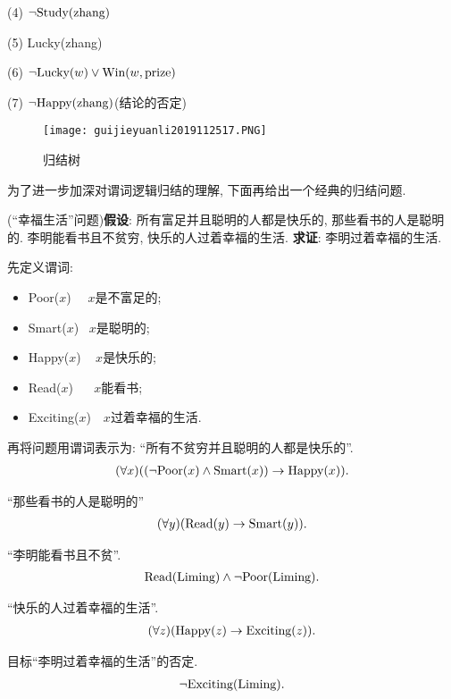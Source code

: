     (4) $\neg \textup{Study}(\textup{zhang})$

    (5) \textup{Lucky}(\textup{zhang})

    (6) $\neg \textup{Lucky}(w)\vee \textup{Win}(w, \textup{prize})$

    (7) $\neg \textup{Happy}(\textup{zhang})$(结论的否定)
\begin{figure}[H]
\centering
\texttt{[image: guijieyuanli2019112517.PNG]}
\caption{归结树}
\label{AI32fig17}
\end{figure}

为了进一步加深对谓词逻辑归结的理解, 下面再给出一个经典的归结问题.
\begin{example}
    (“幸福生活”问题)\textbf{假设}: 所有富足并且聪明的人都是快乐的, 那些看书的人是聪明的. 李明能看书且不贫穷, 快乐的人过着幸福的生活.
\textbf{求证}: 李明过着幸福的生活.
\end{example}
\begin{result}
先定义谓词:
\begin{itemize}
    \item Poor($x$)     \quad\,\,\,\,  $x$是不富足的;
    \item Smart($x$)    \quad\,  $x$是聪明的;
    \item Happy($x$)    \,\,\, $x$是快乐的;
    \item Read($x$)     \,\,\,\,\,\, $x$能看书;
    \item Exciting($x$) \,\, $x$过着幸福的生活.
\end{itemize}

再将问题用谓词表示为: “所有不贫穷并且聪明的人都是快乐的”.
\begin{align}
    (\forall x)((\neg \textup{Poor}(x)\wedge \textup{Smart}(x))\rightarrow \textup{Happy}(x)).
\end{align}

“那些看书的人是聪明的”
\begin{align}
    (\forall y) (\textup{Read}(y) \rightarrow  \textup{Smart}(y)).
\end{align}

“李明能看书且不贫”.
\begin{align}
    \textup{Read}(\textup{Liming})\wedge \neg \textup{Poor}(\textup{Liming}).
\end{align}

“快乐的人过着幸福的生活”.
\begin{align}
    (\forall z) (\textup{Happy}(z)\rightarrow \textup{Exciting}(z)).
\end{align}

目标“李明过着幸福的生活”的否定.
\begin{align}
    \neg \textup{Exciting}(\textup{Liming}).
\end{align}
\end{result}

